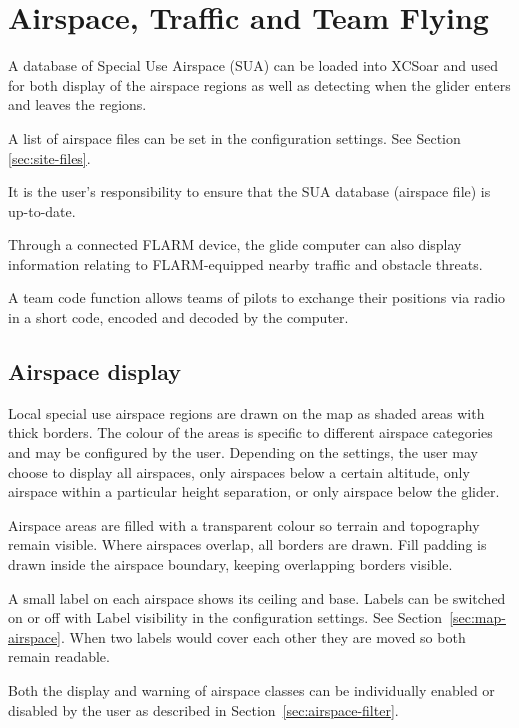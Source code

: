 
\chapter{Airspace, Traffic and Team Flying}\label{cha:airspace}
A database of Special Use Airspace (SUA) can be loaded into XCSoar and
used for both display of the airspace regions as well as detecting
when the glider enters and leaves the regions.

A list of airspace files can be set in the configuration settings.
See Section \ref{sec:site-files}.

It is the user's responsibility to ensure that the SUA database
(air\-space file) is up-to-date.

Through a connected FLARM device, the glide computer can also
display information relating to FLARM-equipped nearby traffic
and obstacle threats.

A team code function allows teams of pilots to exchange their
positions via radio in a short code, encoded and decoded by the
computer.


\section{Airspace display}

Local special use airspace regions are drawn on the map as shaded
areas with thick borders.  The colour of the areas is specific to
different airspace categories and may be configured by the
user.  Depending on the settings, the user may choose to display all
airspaces, only airspaces below a certain altitude, only airspace within a
particular height separation, or only airspace below the glider.

Airspace areas are filled with a transparent colour so terrain and
topography remain visible.  Where airspaces overlap, all borders are
drawn.  Fill padding is drawn inside the airspace boundary, keeping
overlapping borders visible.

A small label on each airspace shows its ceiling and base.  Labels
can be switched on or off with Label visibility in the configuration
settings.  See Section~\ref{sec:map-airspace}.  When two labels would
cover each other they are moved so both remain readable.

Both the display and warning of airspace classes can be individually
enabled or disabled by the user as described in
Section~\ref{sec:airspace-filter}.

